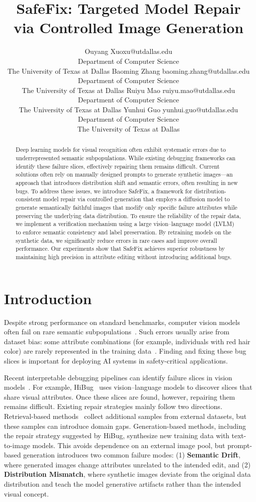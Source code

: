 \documentclass[10pt]{article} %
\title{\Large SafeFix: Targeted Model Repair via Controlled Image Generation}
\author{\name Ouyang Xu\email oxu@utdallas.edu \\
      \addr Department of Computer Science\\
      The University of Texas at Dallas
      \AND
      \name Baoming Zhang \email baoming.zhang@utdallas.edu\\
      \addr Department of Computer Science\\
      The University of Texas at Dallas
      \AND
      \name Ruiyu Mao  \email ruiyu.mao@utdallas.edu \\
      \addr Department of Computer Science\\
      The University of Texas at Dallas 
      \AND
      \name Yunhui Guo  \email yunhui.guo@utdallas.edu \\
      \addr Department of Computer Science\\
      The University of Texas at Dallas }
\newcommand{\model}{SafeFix\xspace}
\newcommand{\hibug}{HiBug\xspace}
\begin{document}
\maketitle

\begin{abstract}
Deep learning models for visual recognition often exhibit systematic errors due to underrepresented semantic subpopulations. While existing debugging frameworks can identify these failure slices, effectively repairing them remains difficult. Current solutions often rely on manually designed prompts to generate synthetic images—an approach that introduces distribution shift and semantic errors, often resulting in new bugs. To address these issues, we introduce \model, a framework for distribution-consistent model repair via controlled generation that employs a diffusion model to generate semantically faithful images that modify only specific failure attributes while preserving the underlying data distribution. To ensure the reliability of the repair data, we implement a verification mechanism using a large vision--language model (LVLM) to enforce semantic consistency and label preservation. By retraining models on the synthetic data, we significantly reduce errors in rare cases and improve overall performance. Our experiments show that \model achieves superior robustness by maintaining high precision in attribute editing without introducing additional bugs.
\end{abstract}

\section{Introduction}
Despite strong performance on standard benchmarks, computer vision models often fail on rare semantic subpopulations~\citep{barbu2019objectnet,gao2023adaptive,leclerc20223db}. Such errors usually arise from dataset bias: some attribute combinations (for example, individuals with red hair color) are rarely represented in the training data~\citep{buolamwini2018gender}. Finding and fixing these bug slices is important for deploying AI systems in safety-critical applications.

Recent interpretable debugging pipelines can identify failure slices in vision models~\citep{gao2023adaptive,chen2023hibug,singla2024data}. For example, \hibug~\citep{chen2023hibug} uses vision--language models to discover slices that share visual attributes. Once these slices are found, however, repairing them remains difficult. Existing repair strategies mainly follow two directions. Retrieval-based methods~\citep{gao2023adaptive,singla2024data} collect additional samples from external datasets, but these samples can introduce domain gaps. Generation-based methods, including the repair strategy suggested by \hibug, synthesize new training data with text-to-image models. This avoids dependence on an external image pool, but prompt-based generation introduces two common failure modes: (1) \textbf{Semantic Drift}, where generated images change attributes unrelated to the intended edit, and (2) \textbf{Distribution Mismatch}, where synthetic images deviate from the original data distribution and teach the model generative artifacts rather than the intended visual concept.
\end{document}
